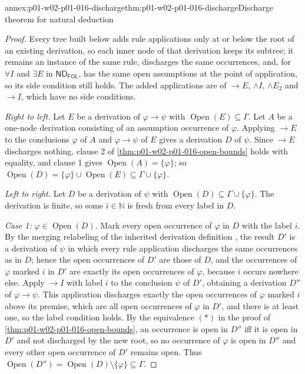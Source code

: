 \begin{annexitem}{annex:p01-w02-p01-016-discharge}{thm:p01-w02-p01-016-discharge}{Discharge theorem for natural deduction}
\begin{proof}
Every tree built below adds rule applications only at or below the root of
an existing derivation, so each inner node of that derivation keeps its
subtree; it remains an instance of the same rule, discharges the same
occurrences, and, for \(\forall I\) and \(\exists E\) in
\(\mathsf{ND}_{\mathsf{FOL}}\), has the same open assumptions at the point of
application, so its side condition still holds. The added applications are
of \(\to E\), \(\land I\), \(\land E_2\) and \(\to I\), which have no side
conditions.

\emph{Right to left.} Let \(E\) be a derivation of \(\varphi\to\psi\) with
\(\operatorname{Open}(E)\subseteq\Gamma\). Let \(A\) be a one-node
derivation consisting of an assumption occurrence of \(\varphi\). Applying
\(\to E\) to the conclusions \(\varphi\) of \(A\) and \(\varphi\to\psi\) of
\(E\) gives a derivation \(D\) of \(\psi\). Since \(\to E\) discharges nothing,
clause 2 of \cref{thm:p01-w02-p01-016-open-bounds} holds with equality, and
clause 1 gives \(\operatorname{Open}(A)=\{\varphi\}\); so
\(\operatorname{Open}(D)=\{\varphi\}\cup\operatorname{Open}(E)
\subseteq\Gamma\cup\{\varphi\}\).

\emph{Left to right.} Let \(D\) be a derivation of \(\psi\) with
\(\operatorname{Open}(D)\subseteq\Gamma\cup\{\varphi\}\). The derivation is
finite, so some \(i\in\mathbb N\) is fresh from every label in \(D\).

\emph{Case 1: \(\varphi\in\operatorname{Open}(D)\).} Mark every open
occurrence of \(\varphi\) in \(D\) with the label \(i\). By the merging
relabeling of the inherited derivation definition \cite[ch.~``Natural
Deduction and Sequents'', definition ``Natural-deduction
derivation'']{FrozenFormalLogicSemanticData}, the result \(D'\) is a
derivation of \(\psi\) in which every rule application discharges the same
occurrences as in \(D\); hence the open occurrences of \(D'\) are those of
\(D\), and the occurrences of \(\varphi\) marked \(i\) in \(D'\) are exactly
its open occurrences of \(\varphi\), because \(i\) occurs nowhere else. Apply
\(\to I\) with label \(i\) to the conclusion \(\psi\) of \(D'\), obtaining a
derivation \(D''\) of \(\varphi\to\psi\). This application discharges exactly
the open occurrences of \(\varphi\) marked \(i\) above its premise, which are
all open occurrences of \(\varphi\) in \(D'\), and there is at least one, so
the label condition holds. By the equivalence \((\ast)\) in the proof of
\cref{thm:p01-w02-p01-016-open-bounds}, an occurrence is open in \(D''\) iff
it is open in \(D'\) and not discharged by the new root, so no occurrence of
\(\varphi\) is open in \(D''\) and every other open occurrence of \(D'\)
remains open. Thus
\(\operatorname{Open}(D'')=\operatorname{Open}(D)\setminus\{\varphi\}
\subseteq\Gamma\).


\end{proof}
\end{annexitem}
